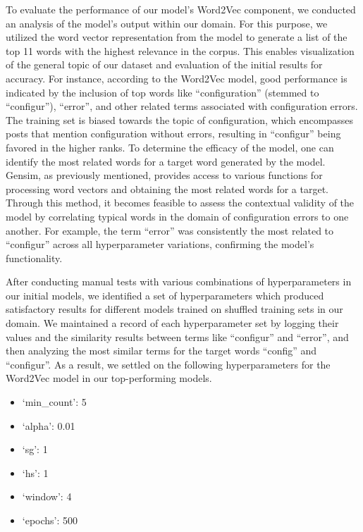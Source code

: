 \documentclass[english,bachelor]{swsLeipzig}
\begin{document}
To evaluate the performance of our model's Word2Vec component, we conducted an analysis of the model's output within 
our domain. For this purpose, we utilized the word vector representation from the model to generate a list of the top 11 words with the highest relevance in the corpus. This enables visualization of the general topic of our dataset and evaluation of the initial results for accuracy. For instance, according to the Word2Vec model, good performance is indicated by the inclusion of top words like ``configuration'' (stemmed to ``configur''), ``error'', and other related terms associated with configuration errors. The training set is biased towards the topic of configuration, which encompasses posts that mention configuration without errors, resulting in ``configur'' being favored in the higher ranks. To determine the efficacy of the model, one can identify the most related words for a target word generated by the model. Gensim, as previously mentioned, provides access to various functions for processing word vectors and obtaining the most related words for a target. Through this method, it becomes feasible to assess the contextual validity of the model by correlating typical words in the domain of configuration errors to one another. For example, the term ``error'' was consistently the most related to ``configur'' across all hyperparameter variations, confirming the model's functionality.

After conducting manual tests with various combinations of hyperparameters in our initial models, we identified a set 
of hyperparameters which produced satisfactory results for different models trained on shuffled training sets in our domain. We maintained a record of each hyperparameter set by logging their values and the similarity results between terms like ``configur'' and ``error'', and then analyzing the most similar terms for the target words ``config'' and ``configur''. As a result, we settled on the following hyperparameters for the Word2Vec model in our top-performing models.

\newpage

\begin{itemize}
  \item `min\_count': 5
  \item `alpha': 0.01
  \item `sg': 1
  \item `hs': 1
  \item `window': 4
  \item `epochs': 500
\end{itemize}
\end{document}
